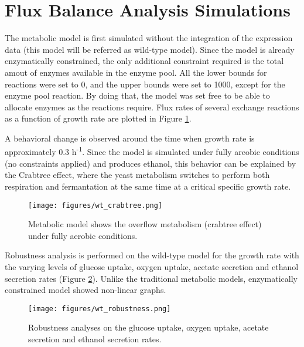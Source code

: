 \section{Flux Balance Analysis Simulations}

The metabolic model is first simulated without the integration of the expression data (this model will be referred as wild-type model). Since the model is already enzymatically constrained, the only additional constraint required is the total amout of enzymes available in the enzyme pool. All the lower bounds for reactions were set to 0, and the upper bounds were set to 1000, except for the enzyme pool reaction. By doing that, the model was set free to be able to allocate enzymes as the reactions require. Flux rates of several exchange reactions as a function of growth rate are plotted in Figure \ref{fig:wt_crabtree}.

A behavioral change is observed around the time when growth rate is approximately 0.3 h\textsuperscript{-1}. Since the model is simulated under fully areobic conditions (no constraints applied) and produces ethanol, this behavior can be explained by the Crabtree effect, where the yeast metabolism switches to perform both respiration and fermantation at the same time at a critical specific growth rate.

\begin{figure}[H]
\begin{center}
\texttt{[image: figures/wt\_crabtree.png]}
\caption[Metabolic model shows the overflow metabolism]{Metabolic model shows the overflow metabolism (crabtree effect) under fully aerobic conditions.}
\end{center}
\label{fig:wt_crabtree}
\end{figure}
\vspace{-1.0cm}

Robustness analysis is performed on the wild-type model for the growth rate with the varying levels of glucose uptake, oxygen uptake, acetate secretion and ethanol secretion rates (Figure \ref{fig:wt_robustness}). Unlike the traditional metabolic models, enzymatically constrained model showed non-linear graphs.

\begin{figure}[H]
\begin{center}
\texttt{[image: figures/wt\_robustness.png]}
\caption[Robustness analyses on the glucose uptake, oxygen uptake, acetate secretion and ethanol secretion rates]{Robustness analyses on the glucose uptake, oxygen uptake, acetate secretion and ethanol secretion rates.}
\end{center}
\label{fig:wt_robustness}
\end{figure}


